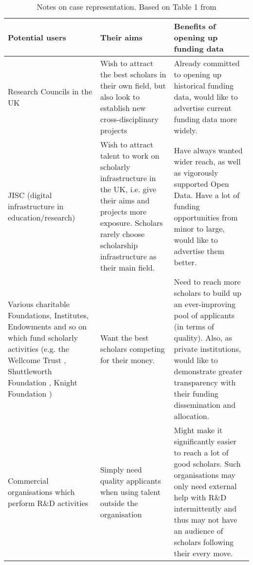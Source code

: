 \bgroup
\tymin=30pt
\def\arraystretch{2}
\begin{table}
\caption{Notes on case representation. Based on Table 1 from \cite{dumbo}}
\begin{tabulary}{\linewidth}{LLL}
Potential users & Their aims & Benefits of opening up funding data \\
\hline
Research Councils in the UK & Wish to attract the best scholars in their own field, but also look to establish new cross-disciplinary  projects & Already committed to opening up historical funding data, would like to advertise current funding data more widely. \\
JISC \cite{jisc} (digital infrastructure in education/research) & Wish to attract talent to work on scholarly infrastructure in the UK, i.e. give their aims and projects more exposure. Scholars rarely choose scholarship infrastructure as their main field. & Have always wanted wider reach, as well as vigorously supported Open Data. Have a lot of funding opportunities from minor to large, would like to advertise them better.\\
Various charitable Foundations, Institutes, Endowments and so on which fund scholarly activities (e.g. the Wellcome Trust \cite{wellcome-trust}, Shuttleworth Foundation \cite{shuttleworth-foundation}, Knight Foundation \cite{knight-foundation}) & Want the best scholars competing for their money. & Need to reach more scholars to build up an ever-improving pool of applicants (in terms of quality). Also, as private institutions, would like to demonstrate greater transparency with their funding dissemination and allocation. \\
Commercial organisations which perform R\&D activities & Simply need quality applicants when using talent outside the organisation & Might make it significantly easier to reach a lot of good scholars. Such organisations may only need external help with R\&D intermittently and thus may not have an audience of scholars following their every move. \\


\end{tabulary}
\end{table}
